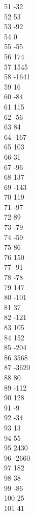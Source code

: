 { 51	-32 \\
 52	53 \\
 53	-92 \\
 54	0 \\
 55	-55 \\
 56	174 \\
 57	1545 \\
 58	-1641 \\
 59	16 \\
 60	-84 \\
 61	115 \\
 62	-56 \\
 63	84 \\
 64	-167 \\
 65	103 \\
 66	31 \\
 67	-96 \\
 68	137 \\
 69	-143 \\
 70	119 \\
 71	-97 \\
 72	89 \\
 73	-79 \\
 74	-59 \\
 75	86 \\
 76	150 \\
 77	-91 \\
 78	-78 \\
 79	147 \\
 80	-101 \\
 81	37 \\
 82	-121 \\
 83	105 \\
 84	152 \\
 85	-204 \\
 86	3568 \\
 87	-3620 \\
 88	80 \\
 89	-112 \\
 90	128 \\
 91	-9 \\
 92	-34 \\
 93	13 \\
 94	55 \\
 95	2430 \\
 96	-2660 \\
 97	182 \\
 98	38 \\
 99	-86 \\
 100	25 \\
 101	41 \\
}

